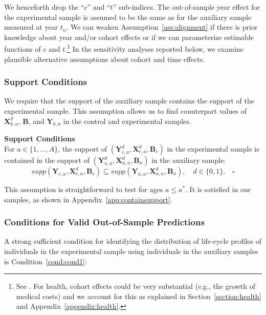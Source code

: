 We henceforth drop the ``$c$'' and ``$t$'' sub-indices. The out-of-sample year effect for the experimental sample is assumed to be the same as for the auxiliary sample measured at year $t_n$. We can weaken Assumption~\ref{ass:alignment} if there is prior knowledge about year and/or cohort effects or if we can parameterize estimable functions of $c$ and $t$.\footnote{See \cite{Heckman_Robb_1985_JE}. For health, cohort effects could be very substantial (e.g., the growth of medical costs) and we account for this as explained in Section~\ref{section:health} and  Appendix~\ref{appendix:health}.} In the sensitivity analyses reported below, we examine plausible alternative assumptions about cohort and time effects.

\subsubsection{Support Conditions}

We require that the support of the auxiliary sample contains the support of the experimental sample. This assumption allows us to find counterpart values of $\bm{X}^d_{k,a}$, $\bm{B}$, and $\bm{Y}_{k,a}$ in the control and experimental samples.

\onehalfspacing
\begin{assumption} \label{ass:contain} \textbf{Support Conditions} \\
For $a \in \{ 1, \ldots, A \}$, the support of $\left( \bm{Y}^d_{e,a}, \bm{X}^d_{e,a}, \bm{B}_e \right)$ in the experimental sample is contained in the support of $\left( \bm{Y}^d_{n,a}, \bm{X}^d_{n,a}, \bm{B}_n \right)$ in the auxiliary sample:
\begin{equation}
supp( \bm{Y}_{e,a}, \bm{X}^d_{e,a}, \bm{B}_e ) \subseteq supp( \bm{Y}_{n,a}, \bm{X}^d_{n,a}, \bm{B}_n ), \quad d \in \{0,1\}. \quad \square
\end{equation}
\end{assumption}
\doublespacing
This assumption is straightforward to test for ages $a\leq a^\ast$. It is satisfied in our samples, as shown in Appendix~\ref{app:containsupport}.

\subsubsection{Conditions for Valid Out-of-Sample Predictions}

A strong sufficient condition for identifying the distribution of life-cycle profiles of individuals in the experimental sample using individuals in the auxiliary samples is Condition~\ref{cond:cond1}:

